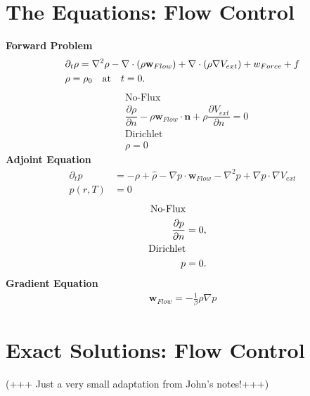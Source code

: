 \documentclass[11pt, a4paper]{article}
\theoremstyle{definition}
\newcommand{\Sta}{\rho}
\newcommand{\Adj}{p}
\begin{document}
\section*{The Equations: Flow Control}
\textbf{Forward Problem}
\begin{align*}
&\partial_t \Sta = \nabla^2 \Sta - \nabla \cdot (\rho \mathbf{w}_{Flow}) + \nabla \cdot (\Sta \nabla V_{ext}) +{w}_{Force} + f \\
& \Sta = \Sta_0 \quad \text{at} \quad t=0.  \notag
\end{align*}
\begin{align*}
&\text{No-Flux}\\
&\dfrac{\partial \Sta}{\partial n} - \Sta \mathbf{w}_{Flow} \cdot \mathbf{n} + \Sta \dfrac{\partial V_{ext}}{\partial n}  =0  \\
&\text{Dirichlet}\\
&\Sta =0 
\end{align*}
\textbf{Adjoint Equation}
\begin{align*}
\partial_t \Adj &= -\Sta + \hat \Sta -  \nabla \Adj \cdot \mathbf w_{Flow} -  \nabla^2 \Adj +  \nabla \Adj \cdot \nabla V_{ext} \\
\Adj(r,T)&=0
\end{align*}
\begin{align*}
\text{No-Flux}  \notag\\
\frac{\partial \Adj }{\partial n}&=0,  \notag\\
\text{Dirichlet}\\
\Adj&=0.
\end{align*}
\textbf{Gradient Equation                             }
\begin{align*}
\mathbf w_{Flow}=-\frac{1}{\beta}\Sta \nabla \Adj
\end{align*} 





\section*{Exact Solutions: Flow Control}
(+++ Just a very small adaptation from John's notes!+++)
\end{document}
